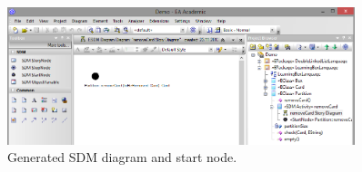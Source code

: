 \begin{figure}[htp]
\begin{center}
  \includegraphics[width=0.9\textwidth]{pics/sdmBilder/removeCard/sdm02RAW}
  \caption{Generated SDM diagram and start node.}  
  \label{fig:sdm_skeleton}
\end{center}
\end{figure}

% 
% 
% 

